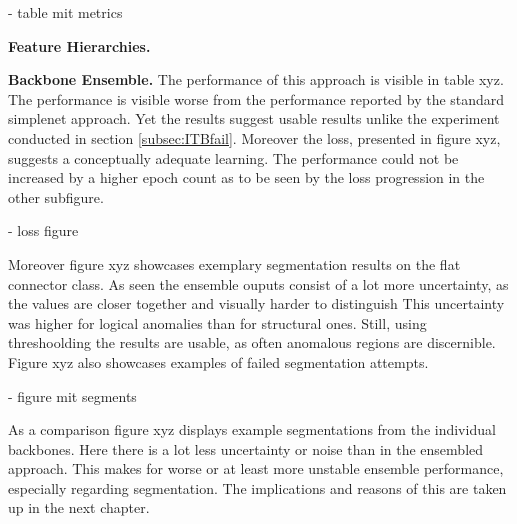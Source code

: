 - table mit metrics


\textbf{Feature Hierarchies.}


\textbf{Backbone Ensemble.} The performance of this approach is visible in table xyz. The performance is visible worse from the performance 
reported by the standard simplenet approach. Yet the results suggest usable results unlike the experiment conducted in section \ref{subsec:ITBfail}. 
Moreover the loss, presented in figure xyz, suggests a conceptually adequate learning. The performance could not be increased by a higher 
epoch count as to be seen by the loss progression in the other subfigure.

- loss figure

Moreover figure xyz showcases exemplary segmentation results on the flat connector class. As 
seen the ensemble ouputs consist of a lot more uncertainty, as the values are closer together and visually harder to distinguish This uncertainty 
was higher for logical anomalies than for structural ones. Still, 
using threshoolding the results are usable, as often anomalous regions are discernible. Figure xyz also showcases examples of failed segmentation 
attempts. 

- figure mit segments 

As a comparison figure xyz displays example segmentations from the individual backbones. Here there is a lot less uncertainty or 
noise than in the ensembled approach. This makes for worse or at least more unstable ensemble performance, especially regarding segmentation. 
The implications and reasons of this are taken up in the next chapter.


